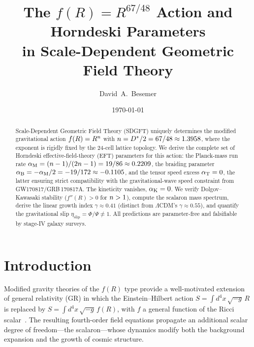 \documentclass[amsmath,amssymb,aps,prd,twocolumn,superscriptaddress,nofootinbib]{revtex4-2}
\begin{document}

\title{The $f(R) = R^{67/48}$ Action and Horndeski Parameters\\
in Scale-Dependent Geometric Field Theory}

\author{David~A.~Besemer}

\date{\today}

\begin{abstract}
Scale-Dependent Geometric Field Theory (SDGFT) uniquely determines
the modified gravitational action $f(R) = R^{n}$ with
$n = D^{*}/2 = 67/48 \approx 1.3958$, where the exponent is
rigidly fixed by the 24-cell lattice topology.  We derive the
complete set of Horndeski effective-field-theory (EFT) parameters
for this action:  the Planck-mass run rate
$\alpha_{\mathrm{M}} = (n - 1)/(2n - 1) = 19/86 \approx 0.2209$, the
braiding parameter $\alpha_{\mathrm{B}} = -\alpha_{\mathrm{M}}/2 = -19/172 \approx -0.1105$, and
the tensor speed excess $\alpha_{\mathrm{T}} = 0$, the latter ensuring strict
compatibility with the gravitational-wave speed constraint from
GW170817/GRB\,170817A.  The kineticity vanishes, $\alpha_{\mathrm{K}} = 0$.
We verify Dolgov--Kawasaki stability ($f''(R) > 0$ for $n > 1$),
compute the scalaron mass spectrum, derive the linear growth index
$\gamma \approx 0.41$ (distinct from $\Lambda$CDM's $\gamma \approx
0.55$), and quantify the gravitational slip
$\eta_{\mathrm{slip}} = \Phi/\Psi \neq 1$.  All predictions are
parameter-free and falsifiable by stage-IV galaxy surveys.
\end{abstract}

\maketitle

\section{Introduction}
\label{sec:intro}

Modified gravity theories of the $f(R)$ type provide a
well-motivated extension of general relativity (GR) in which the
Einstein--Hilbert action $S = \int d^4x\,\sqrt{-g}\,R$ is replaced
by $S = \int d^4x\,\sqrt{-g}\,f(R)$, with $f$ a general function
of the Ricci scalar~\cite{Sotiriou2010,DeFelice2010}.  The
resulting fourth-order field equations propagate an additional
scalar degree of freedom---the scalaron---whose dynamics modify
both the background expansion and the growth of cosmic structure.
\end{document}
